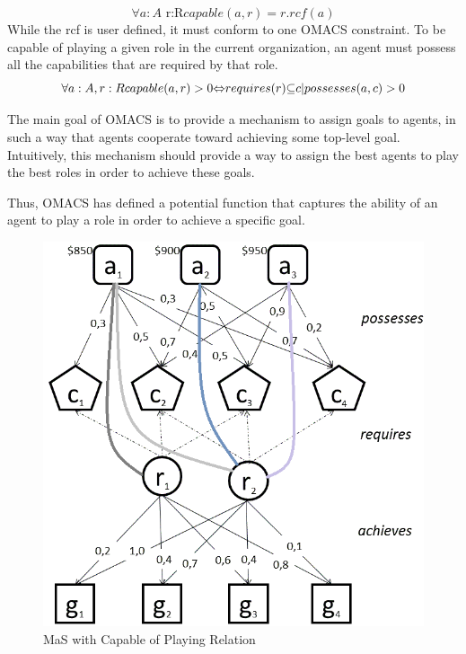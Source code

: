 \begin{equation}
\forall a:A\textrm{ r:R}capable(a,r)=r.rcf(a)\label{eq:Funccapable}
\end{equation}
While the rcf is user defined, it must conform to one OMACS constraint. 
To be capable of playing a given role in the current organization,
 an agent must possess all the capabilities that are required by that role\cite{omacs2}.
\begin{equation}
\text{\ensuremath{\forall}}a:A,r:Rcapable(a,r)>0\text{\ensuremath{\Leftrightarrow}}requires(r)\text{\ensuremath{\subseteq}}{c|possesses(a,c)>0}\label{eq:FuncCapable2}
\end{equation}

The main goal of OMACS is to provide a mechanism to assign goals to agents\cite{omacs2}, 
in such a way that agents cooperate toward achieving some top-level goal.
Intuitively, this mechanism should provide a way to assign the best agents 
to play the best roles in order to achieve these goals. 

Thus, OMACS has defined  a potential function that captures the ability of an agent 
to play a role in order  to achieve a specific goal\cite{omacs2}.

\begin{figure}[th]
	\centering
		\includegraphics[scale=0.5]{ch1/img/mag}
	\caption{\label{fig:Capable Of playing Relation} MaS with Capable of Playing Relation \cite{omacs0}}
\end{figure}
\pagebreak
